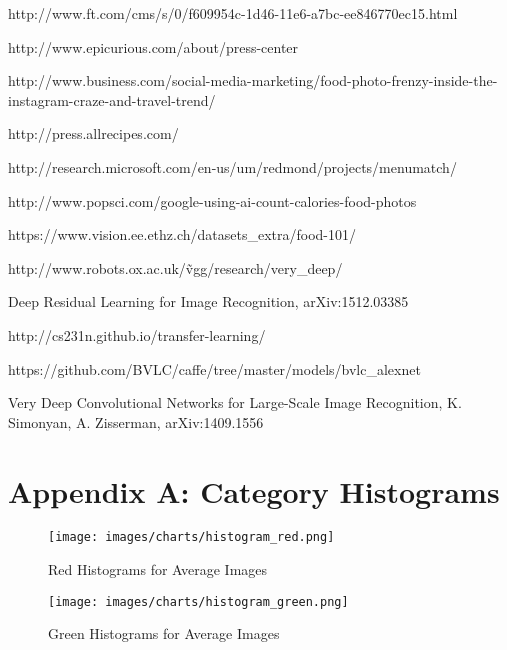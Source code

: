 \documentclass[10pt,a4paper]{article}
\begin{document}
\clearpage
\begin{thebibliography}{1}

   http://www.ft.com/cms/s/0/f609954c-1d46-11e6-a7bc-ee846770ec15.html

   http://www.epicurious.com/about/press-center

   http://www.business.com/social-media-marketing/food-photo-frenzy-inside-the-instagram-craze-and-travel-trend/

   http://press.allrecipes.com/

   http://research.microsoft.com/en-us/um/redmond/projects/menumatch/
  
   http://www.popsci.com/google-using-ai-count-calories-food-photos

   https://www.vision.ee.ethz.ch/datasets\_extra/food-101/
  
   http://www.robots.ox.ac.uk/\~vgg/research/very\_deep/

   Deep Residual Learning for Image Recognition, arXiv:1512.03385
  
   http://cs231n.github.io/transfer-learning/
  
   https://github.com/BVLC/caffe/tree/master/models/bvlc\_alexnet
  
   Very Deep Convolutional Networks for Large-Scale Image Recognition, K. Simonyan, A. Zisserman, arXiv:1409.1556
  
\end{thebibliography}

\clearpage
\appendix
\section{Appendix A: Category Histograms} \label{App:AppendixA}

\begin{figure}[h]
  \caption{Red Histograms for Average Images}
  \texttt{[image: images/charts/histogram\_red.png]}
  \label{fig:red-histograms}
\end{figure}

\begin{figure}[h]
  \caption{Green Histograms for Average Images}
  \texttt{[image: images/charts/histogram\_green.png]}
  \label{fig:green-histograms}
\end{figure}
\end{document}
